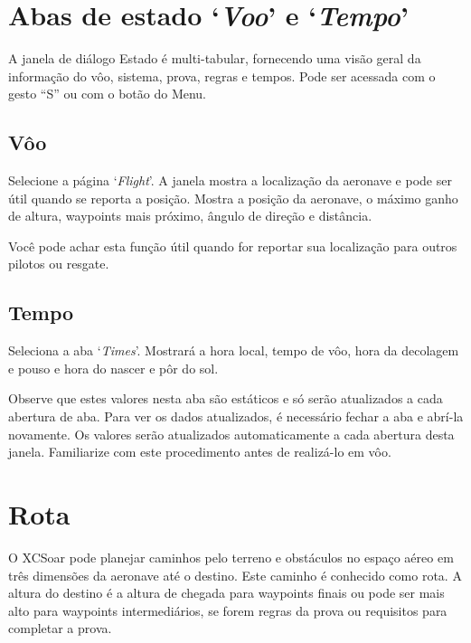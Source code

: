 \section{Abas de estado `{\it Voo}' e `{\it Tempo}'}\label{sec:flight-status}

A janela de diálogo Estado é multi-tabular, fornecendo uma visão geral da informação do vôo, sistema, prova, regras e tempos.  Pode ser acessada com o gesto “S” ou com o botão do Menu. 
\begin{quote}
\blink{}
\end{quote}

\subsection*{Vôo}
Selecione a página `{\it Flight}'. 
A janela mostra a localização da aeronave e pode ser útil quando se reporta a posição.  Mostra a posição da aeronave, o máximo ganho de altura, waypoints mais próximo, ângulo de direção e distância.

Você pode achar esta função útil quando for reportar sua localização para outros pilotos ou resgate.

\subsection*{Tempo}\label{sec:time-status}
Seleciona a aba  `{\it Times}'. 
Mostrará a hora local, tempo de vôo, hora da decolagem e pouso e hora do nascer e pôr do sol.

Observe que estes valores nesta aba são estáticos e só serão atualizados a cada abertura de aba. 
Para ver os dados atualizados, é necessário fechar a aba e abrí-la novamente.  Os valores serão atualizados automaticamente a cada abertura desta janela.  Familiarize com este procedimento antes de realizá-lo em vôo.


\section{Rota}\label{sec:route}

O XCSoar pode planejar caminhos pelo terreno e obstáculos no espaço aéreo em três dimensões da aeronave até o destino.  Este caminho é conhecido como rota.  A altura do destino é a altura de chegada para waypoints finais ou pode ser mais alto para waypoints intermediários, se forem regras da prova ou requisitos para completar a prova.  

